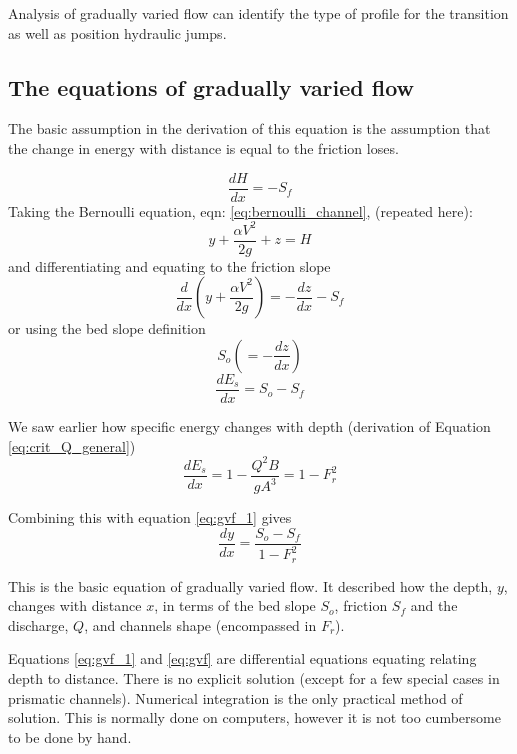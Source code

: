 \documentclass[a4paper, 12pt, british]{article} %
\numberwithin{equation}{section}
\numberwithin{figure}{section}
\numberwithin{table}{section}
\begin{document}
Analysis of gradually varied flow can identify the type of profile for the transition as well as position hydraulic jumps.


\subsection{The equations of gradually varied flow}

The basic assumption in the derivation of this equation is the assumption that the change in energy with distance is equal to the friction loses.

\begin{equation}
\frac{dH}{dx} = -S_f
\label{eq:gvf_0}
\end{equation}
Taking the Bernoulli equation, eqn: \ref{eq:bernoulli_channel}, (repeated here):
  \begin{equation}
y  + \frac{ \alpha V^2}{2g} + z  = H
\label{eq:bernoulli_channel2}
\end{equation} 
and differentiating and equating to the friction slope
\begin{equation}
\frac{d}{dx}\left(y  + \frac{ \alpha V^2}{2g}\right) = - \frac{dz}{dx} -S_f
\end{equation}
or using the bed slope definition
\begin{equation}
S_o \left(=-\frac{dz}{dx}\right)
\end{equation}
\begin{equation}
\frac{dE_s}{dx} = S_o-S_f
\label{eq:gvf_1} %
\end{equation}

We saw earlier how specific energy changes with depth (derivation of Equation \ref{eq:crit_Q_general})
\begin{equation}
\frac{dE_s}{dx} = 1 - \frac{Q^2 B}{g A^3} = 1 - F_r^2
\label{eq:gvf_2} %
\end{equation} 

Combining this with equation \ref{eq:gvf_1} gives
\begin{equation}
\frac{dy}{dx} = \frac{S_o-S_f}{1 - F_r^2}
\label{eq:gvf} %
\end{equation} 

This is the basic equation of gradually varied flow. It described how the depth, $y$, changes with distance $x$, in terms of the bed slope $S_o$, friction $S_f$ and the discharge, $Q$, and channels shape (encompassed in $F_r$).

Equations \ref{eq:gvf_1} and \ref{eq:gvf} are differential equations equating relating depth to distance. There is no explicit solution (except for a few special cases in prismatic channels). Numerical integration is the only practical method of solution. This is normally done on computers, however it is not too cumbersome to be done by hand.
\end{document}
